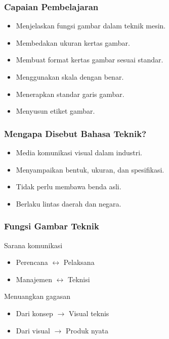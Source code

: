 \documentclass[../gbr_teknik.tex]{subfiles}
\begin{document}
\begin{frame}[t,mycolor=digiPH_white,mytitle=standard,light]
	\frametitle{Capaian Pembelajaran}

	\begin{itemize}
		\item<-4> Menjelaskan fungsi gambar dalam teknik mesin.
		\item<-4> Membedakan ukuran kertas gambar.
		\item<-4> Membuat format kertas gambar sesuai standar.
		\item<-4> Menggunakan skala dengan benar.
		\item<5-6> Menerapkan standar garis gambar.
		\item<5-6> Menyusun etiket gambar.
	\end{itemize}
\end{frame}

\begin{frame}[t,mycolor=digiPH_leaf,mytitle=standard,dark]

	\frametitle{Mengapa Disebut Bahasa Teknik?}

	\begin{itemize}
		\item Media komunikasi visual dalam industri.
		\item Menyampaikan bentuk, ukuran, dan spesifikasi.
		\item Tidak perlu membawa benda asli.
		\item Berlaku lintas daerah dan negara.
	\end{itemize}


\end{frame}


\begin{frame}[t,mycolor=digiPH_ocean,mytitle=center,dark]

	\frametitle{Fungsi Gambar Teknik}
	Sarana komunikasi
	\begin{itemize}
		\item Perencana $\leftrightarrow$ Pelaksana
		\item Manajemen $\leftrightarrow$ Teknisi
	\end{itemize}

	Menuangkan gagasan
	\begin{itemize}
		\item Dari konsep $\rightarrow$ Visual teknis
		\item Dari visual $\rightarrow$ Produk nyata
	\end{itemize}
\end{frame}
\end{document}

